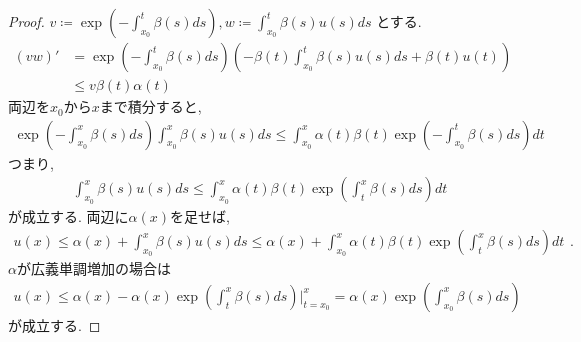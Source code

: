 \documentclass{ltjsarticle}
\begin{document}
  \begin{proof}
    $v\coloneqq  \exp(-\int_{x_0}^t \beta (s) ds), w\coloneqq  \int_{x_0}^t \beta (s)u(s) ds$
    とする. 
    \begin{equation}
      \begin{aligned}
        (vw)' &= \exp \left(-\int_{x_0}^t \beta (s) ds\right)\left( - \beta (t) \int_{x_0}^t \beta (s)u(s) ds + 
          \beta (t) u(t) \right) \\
              &\leq  v  \beta (t) \alpha (t)  
      \end{aligned}
    \end{equation} 
    両辺を$x_0$から$x$まで積分すると, 
    \begin{equation}
      \begin{aligned}
        \exp\left(-\int_{x_0}^x \beta (s) ds\right) \int_{x_0}^x \beta (s) u(s) ds \leq \int_{x_0}^x 
        \alpha (t) \beta (t) \exp\left( -\int_{x_0}^t \beta (s) ds \right) dt
      \end{aligned}
    \end{equation} 
    つまり, 
    \begin{equation}
      \begin{aligned}
        \int_{x_0}^x \beta (s) u(s) ds \leq \int_{x_0}^x \alpha (t) \beta (t) \exp\left( \int_{t}^x \beta (s) ds \right) dt
      \end{aligned}
    \end{equation} 
    が成立する. 
    両辺に$\alpha (x)$を足せば, 
\begin{equation}
  \begin{aligned}
   u(x) \leq \alpha (x)    + \int_{x_0}^x \beta (s) u(s) ds \leq \alpha (x) + \int_{x_0}^x \alpha (t) \beta (t) \exp\left( \int_{t}^x \beta (s) ds \right) dt
  \end{aligned}.
\end{equation} 
$\alpha $が広義単調増加の場合は
\begin{equation}
  \begin{aligned}
    u(x) \leq \alpha (x) - \alpha (x) \exp\left( \int_{t}^x\beta (s) ds\right)\Big|_{t=x_0}^x = \alpha (x) \exp \left( \int_{x_0}^x \beta (s) ds \right) 
  \end{aligned}
\end{equation} 
が成立する. 


  \end{proof}
\end{document}
